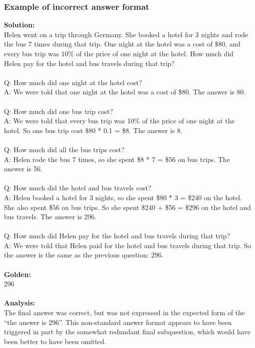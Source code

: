 \subsubsection{Example of incorrect answer format}

\textbf{Solution:} \\
Helen went on a trip through Germany. She booked a hotel for 3 nights and rode the bus 7 times during that trip. One night at the hotel was a cost of \$80, and every bus trip was 10\% of the price of one night at the hotel. How much did Helen pay for the hotel and bus travels during that trip? \\
 \\
Q: How much did one night at the hotel cost? \\
A: We were told that one night at the hotel was a cost of \$80. The answer is 80. \\
 \\
Q: How much did one bus trip cost? \\
A: We were told that every bus trip was 10\% of the price of one night at the hotel. So one bus trip cost \$80 * 0.1 = \$8. The answer is 8. \\
 \\
Q: How much did all the bus trips cost? \\
A: Helen rode the bus 7 times, so she spent \$8 * 7 = \$56 on bus trips. The answer is 56. \\
 \\
Q: How much did the hotel and bus travels cost? \\
A: Helen booked a hotel for 3 nights, so she spent \$80 * 3 = \$240 on the hotel. She also spent \$56 on bus trips. So she spent \$240 + \$56 = \$296 on the hotel and bus travels. The answer is 296. \\
 \\
Q: How much did Helen pay for the hotel and bus travels during that trip? \\
A: We were told that Helen paid for the hotel and bus travels during that trip. So the answer is the same as the previous question: 296. \\
 \\
\textbf{Golden:} \\
296 \\
 \\
\textbf{Analysis:} \\
The final answer was correct, but was not expressed in the expected form of the ``the answer is 296''. This non-standard answer format appears to have been triggered in part by the somewhat redundant final subquestion, which would have been better to have been omitted.

